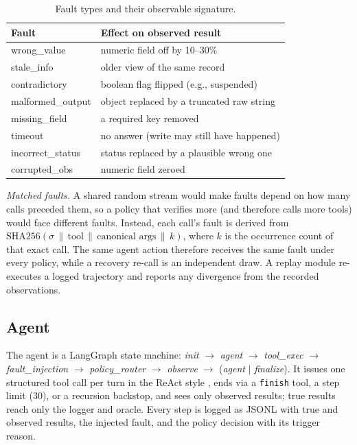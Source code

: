 \documentclass[conference]{IEEEtran}
\begin{document}
\begin{table}[t]
\caption{Fault types and their observable signature.}
\label{tab:faults}
\centering
\footnotesize
\begin{tabular}{@{}p{}p{}@{}}
\toprule
Fault & Effect on observed result \\
\midrule
wrong\_value & numeric field off by 10--30\% \\
stale\_info & older view of the same record \\
contradictory & boolean flag flipped (e.g., suspended) \\
malformed\_output & object replaced by a truncated raw string \\
missing\_field & a required key removed \\
timeout & no answer (write may still have happened) \\
incorrect\_status & status replaced by a plausible wrong one \\
corrupted\_obs & numeric field zeroed \\
\bottomrule
\end{tabular}
\end{table}

\emph{Matched faults.} A shared random stream would make faults depend on how many calls
preceded them, so a policy that verifies more (and therefore calls more tools) would face
different faults. Instead, each call's fault is derived from
$\mathrm{SHA256}(\sigma \,\|\, \text{tool} \,\|\, \text{canonical args} \,\|\, k)$, where $k$ is the
occurrence count of that exact call. The same agent action therefore receives the same fault
under every policy, while a recovery re-call is an independent draw. A replay module
re-executes a logged trajectory and reports any divergence from the recorded observations.

\subsection{Agent}
The agent is a LangGraph \cite{langgraph} state machine:
\textit{init} $\rightarrow$ \textit{agent} $\rightarrow$ \textit{tool\_exec} $\rightarrow$
\textit{fault\_injection} $\rightarrow$ \textit{policy\_router} $\rightarrow$ \textit{observe}
$\rightarrow$ (\textit{agent} $|$ \textit{finalize}). It issues one structured tool call per turn
in the ReAct style \cite{yao2023react}, ends via a \texttt{finish} tool, a step limit (30), or a
recursion backstop, and sees only observed results; true results reach only the logger and
oracle. Every step is logged as JSONL with true and observed results, the injected fault, and
the policy decision with its trigger reason.
\end{document}
